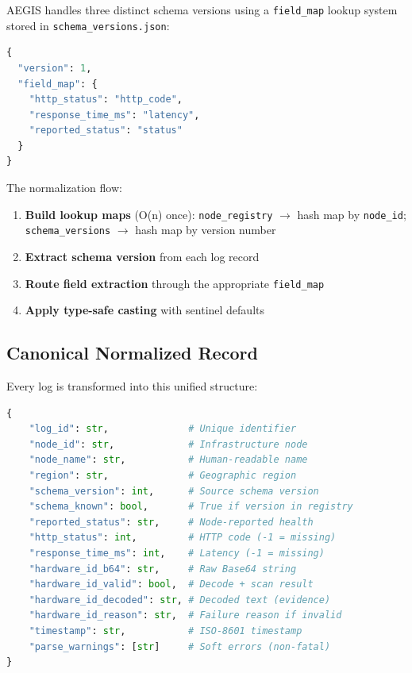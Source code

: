\documentclass[12pt,a4paper]{article}
\begin{document}
AEGIS handles three distinct schema versions using a \texttt{field\_map} lookup system stored in \texttt{schema\_versions.json}:

\begin{lstlisting}[language=Python, caption={Schema version field map structure}]
{
  "version": 1,
  "field_map": {
    "http_status": "http_code",
    "response_time_ms": "latency",
    "reported_status": "status"
  }
}
\end{lstlisting}

The normalization flow:
\begin{enumerate}[noitemsep]
    \item \textbf{Build lookup maps} (O(n) once): \texttt{node\_registry} $\rightarrow$ hash map by \texttt{node\_id}; \texttt{schema\_versions} $\rightarrow$ hash map by version number
    \item \textbf{Extract schema version} from each log record
    \item \textbf{Route field extraction} through the appropriate \texttt{field\_map}
    \item \textbf{Apply type-safe casting} with sentinel defaults
\end{enumerate}

\subsection{Canonical Normalized Record}

Every log is transformed into this unified structure:

\begin{lstlisting}[language=Python, caption={Normalized log structure}]
{
    "log_id": str,              # Unique identifier
    "node_id": str,             # Infrastructure node
    "node_name": str,           # Human-readable name
    "region": str,              # Geographic region
    "schema_version": int,      # Source schema version
    "schema_known": bool,       # True if version in registry
    "reported_status": str,     # Node-reported health
    "http_status": int,         # HTTP code (-1 = missing)
    "response_time_ms": int,    # Latency (-1 = missing)
    "hardware_id_b64": str,     # Raw Base64 string
    "hardware_id_valid": bool,  # Decode + scan result
    "hardware_id_decoded": str, # Decoded text (evidence)
    "hardware_id_reason": str,  # Failure reason if invalid
    "timestamp": str,           # ISO-8601 timestamp
    "parse_warnings": [str]     # Soft errors (non-fatal)
}
\end{lstlisting}
\end{document}
